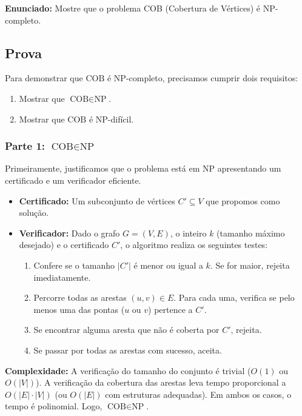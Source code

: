 \documentclass[a4paper,12pt]{article}
\begin{document}
\textbf{Enunciado:} Mostre que o problema COB (Cobertura de Vértices) é NP-completo.

\subsection*{Prova}

Para demonstrar que $\text{COB}$ é NP-completo, precisamos cumprir dois requisitos:
\begin{enumerate}
    \item Mostrar que $\text{COB} \in \text{NP}$.
    \item Mostrar que $\text{COB}$ é NP-difícil.
\end{enumerate}

\subsubsection*{Parte 1: $\text{COB} \in \text{NP}$}

Primeiramente, justificamos que o problema está em NP apresentando um certificado e um verificador eficiente.

\begin{itemize}
    \item \textbf{Certificado:} Um subconjunto de vértices $C' \subseteq V$ que propomos como solução.
    \item \textbf{Verificador:} Dado o grafo $G=(V, E)$, o inteiro $k$ (tamanho máximo desejado) e o certificado $C'$, o algoritmo realiza os seguintes testes:
    \begin{enumerate}
        \item Confere se o tamanho $|C'|$ é menor ou igual a $k$. Se for maior, rejeita imediatamente.
        \item Percorre todas as arestas $(u, v) \in E$. Para cada uma, verifica se pelo menos uma das pontas ($u$ ou $v$) pertence a $C'$.
        \item Se encontrar alguma aresta que não é coberta por $C'$, rejeita.
        \item Se passar por todas as arestas com sucesso, aceita.
    \end{enumerate}
\end{itemize}
\textbf{Complexidade:} A verificação do tamanho do conjunto é trivial ($O(1)$ ou $O(|V|)$). A verificação da cobertura das arestas leva tempo proporcional a $O(|E| \cdot |V|)$ (ou $O(|E|)$ com estruturas adequadas). Em ambos os casos, o tempo é polinomial. Logo, $\text{COB} \in \text{NP}$.
\end{document}
